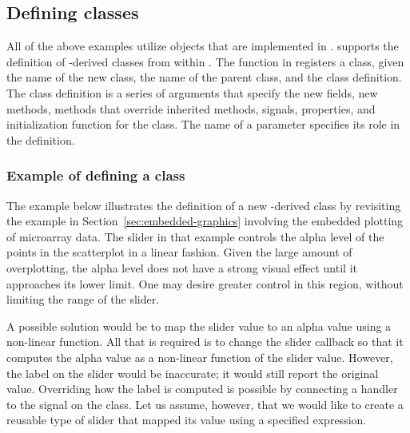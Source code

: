 \documentclass[article,shortnames]{jss}
\begin{document}
\subsection[Defining GObject classes]{Defining  classes}
\label{sec:classes}

All of the above examples utilize objects that are implemented in
.
 supports the definition of -derived classes
from within
.  The  function in  registers a 
class, given the name of the new class, the name of the parent class,
and the class 
definition. The class definition is a series of arguments that specify
the new fields, new methods, 
methods that override inherited methods,
 signals, properties, and
initialization function
for the class. The name of a parameter specifies its role in the
definition.

\subsubsection{Example of defining a class}

The example below illustrates the definition of a new
-derived
class by revisiting the example in Section~\ref{sec:embedded-graphics}
involving the embedded plotting of 
microarray data.
The slider in that example controls the alpha level of the
points in the scatterplot in a linear fashion. Given the large amount
of
overplotting, the alpha level does not have a strong visual effect
until it
approaches its lower limit. One may desire greater control in this
region,
without limiting the range of the slider. 

A possible solution would be to map the slider value to an alpha value
using a non-linear function. All that is required is to change the
slider callback so that it computes the alpha value as a non-linear
function of the slider value. However, the label on the slider would
be inaccurate; it would still report the original value.  Overriding
how the label is computed is possible by connecting a handler
to the
 signal on the  class. Let us
assume,
however, that we would like to create a reusable type of slider that
mapped its value using a specified  expression.
\end{document}
